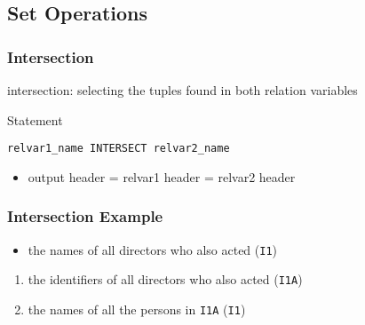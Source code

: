 \documentclass[dvipsnames]{beamer}
\theoremstyle{plain}
\begin{document}
\subsection{Set Operations}

\begin{frame}[fragile]
  \frametitle{Intersection}

  \begin{definition}
    \alert{intersection}: selecting the tuples found in both relation variables
  \end{definition}

  \pause
  \begin{block}{Statement}
    \begin{lstlisting}
relvar1_name INTERSECT relvar2_name
    \end{lstlisting}
  \end{block}

  \pause
  \begin{itemize}
    \item output header = relvar1 header = relvar2 header
  \end{itemize}
\end{frame}

\begin{frame}
  \frametitle{Intersection Example}

  \begin{example}
    \begin{itemize}
      \item the names of all directors who also acted (\texttt{I1})
    \end{itemize}

    \pause
    \begin{enumerate}
      \item the identifiers of all directors who also acted (\texttt{I1A})

      \pause
      \item the names of all the persons in \texttt{I1A} (\texttt{I1})
    \end{enumerate}
  \end{example}
\end{frame}
\end{document}
